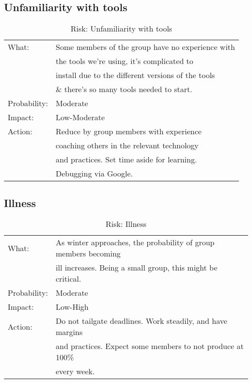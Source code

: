 \subsection{Unfamiliarity with tools}
\begin{table}[H]
\begin{tabular}{| l | l |}
	\hline
	What: & Some members of the group have no experience with\\
	& the tools we're using, it's complicated to\\
	& install due to the different versions of the tools \\
	& \& there's so many tools needed to start.\\
	\hline
	Probability: & Moderate \\
	\hline
	Impact: & Low-Moderate \\
	\hline
	Action: & Reduce by group members with experience \\
	& coaching others in the relevant technology\\
	& and practices. Set time aside for learning.\\
	& Debugging via Google.\\
	\hline
\end{tabular}
\caption{Risk: Unfamiliarity with tools}
\end{table}

\subsection{Illness}
\begin{table}[H]
\begin{tabular}{| l | l |}
	\hline
	What: & As winter approaches, the probability of group members becoming \\	 & ill increases. Being a small group, this might be critical.\\
	\hline
	Probability: & Moderate \\
	\hline
	Impact: & Low-High \\
	\hline
	Action: & Do not tailgate deadlines. Work steadily, and have margins\\
	&and practices. Expect some members to not produce at 100\%\\	& every week.\\
	\hline
\end{tabular}
\caption{Risk: Illness}
\end{table}


